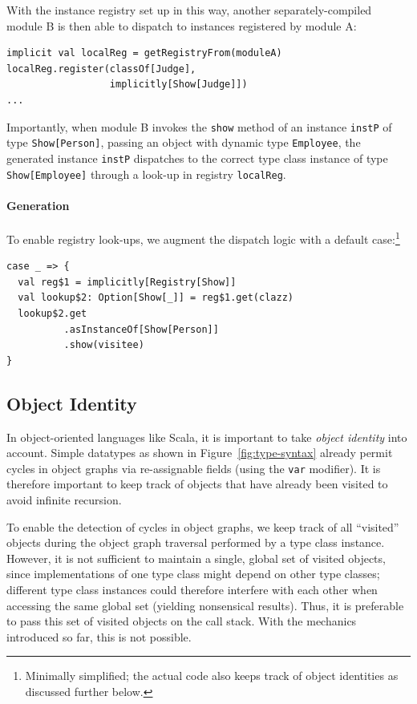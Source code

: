 \documentclass[preprint,nocopyrightspace]{sigplanconf}
\begin{document}
With the instance registry set up in this way, another separately-compiled
module B is then able to dispatch to instances registered by module A:

\begin{lstlisting}
implicit val localReg = getRegistryFrom(moduleA)
localReg.register(classOf[Judge],
                  implicitly[Show[Judge]])
...
\end{lstlisting}
\noindent
Importantly, when module B invokes the \verb|show| method of an instance
\verb|instP| of type \verb|Show[Person]|, passing an object with dynamic type
\verb|Employee|, the generated instance \verb|instP| dispatches to the correct
type class instance of type \verb|Show[Employee]| through a look-up in
registry \verb|localReg|.

\paragraph{Generation}

To enable registry look-ups, we augment the dispatch logic with a default
case:\footnote{Minimally simplified; the actual code also keeps track of object
identities as discussed further below.}
\begin{lstlisting}
case _ => {
  val reg$1 = implicitly[Registry[Show]]
  val lookup$2: Option[Show[_]] = reg$1.get(clazz)
  lookup$2.get
          .asInstanceOf[Show[Person]]
          .show(visitee)
}
\end{lstlisting}


\subsection{Object Identity}\label{sec:oo-object-identity}

In object-oriented languages like Scala, it is important to take \emph{object
identity} into account. Simple datatypes as shown in
Figure~\ref{fig:type-syntax} already permit cycles in object graphs via re-assignable
fields (using the \verb|var| modifier). It is therefore important to keep
track of objects that have already been visited to avoid infinite recursion.

To enable the detection of cycles in object graphs, we keep track of all
``visited'' objects during the object graph traversal performed by a type
class instance. However, it is not sufficient to maintain a single, global set
of visited objects, since implementations of one type class might depend on
other type classes; different type class instances could therefore interfere
with each other when accessing the same global set (yielding nonsensical
results). Thus, it is preferable to pass this set of visited objects on the
call stack. With the mechanics introduced so far, this is not possible.
\end{document}
